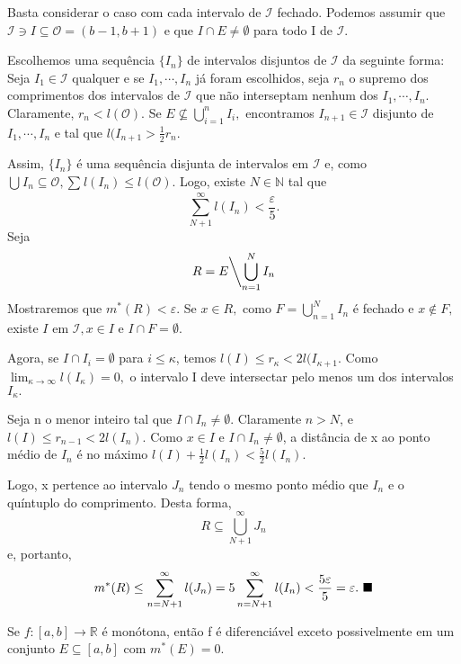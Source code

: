 \documentclass[analysis_notes.tex]{subfiles}
\begin{document}
\begin{proof*}
	Basta considerar o caso com cada intervalo de \(\mathcal{I}\) fechado. Podemos assumir que
	\(\mathcal{I}\ni I \subseteq{\mathcal{O}=(b-1, b+1)}\) e que \(I\cap E \neq\emptyset\) para todo I
	de \(\mathcal{I}\).

	Escolhemos uma sequência \(\{I_{n}\}\) de intervalos disjuntos de \(\mathcal{I}\) da
	seguinte forma: Seja \(I_{1}\in \mathcal{I}\) qualquer e se \(I_{1}, \cdots, I_{n}\) já foram
	escolhidos, seja \(r_{n}\) o supremo dos comprimentos dos intervalos de \(\mathcal{I}\) que não interseptam
	nenhum dos \(I_{1}, \cdots, I_{n}\). Claramente, \(r_{n} <  l(\mathcal{O}).\) Se
	\(E\not\subseteq{\bigcup_{i=1}^{n}{I_{i}}},\) encontramos \(I_{n+1}\in \mathcal{I}\)
	disjunto de \(I_{1}, \cdots, I_{n}\) e tal que \(l(I_{n+1} > \frac{1}{2}r_{n}\).

	Assim, \(\{I_{n}\}\) é uma sequência disjunta de intervalos em \(\mathcal{I}\) e, como
	\(\bigcup_{}^{}{I_{n}\subseteq{\mathcal{O}}}, \sum\limits_{}^{}l(I_{n})\leq l(\mathcal{O}).\) Logo,
	existe \(N\in \mathbb{N}\) tal que
	\[
		\sum\limits_{N+1}^{\infty} l(I_{n}) < \frac{\varepsilon }{5}.
	\]
	Seja
	\[
		R = E\biggl\backslash\bigcup_{n=1}^{N}{I_{n}}\biggr.
	\]
	Mostraremos que \(m^{*}(R) < \varepsilon .\) Se \(x\in R,\) como \(F = \bigcup_{n=1}^{N}{I_{n}}\) é
	fechado e \(x\not\in F,\) existe \(I\) em \(\mathcal{I}, x\in I\) e \(I\cap F=\emptyset.\)

	Agora, se \(I\cap I_{i} = \emptyset\) para \(i\leq \kappa \), temos \(l(I)\leq r_{\kappa } < 2l(I_{\kappa +1}.\)
	Como \(\lim_{\kappa \to \infty}l(I_{\kappa }) = 0,\) o intervalo I deve intersectar
	pelo menos um dos intervalos \(I_{\kappa }.\)

	Seja n o menor inteiro tal que \(I\cap I_{n} \neq\emptyset\). Claramente \(n > N\), e
	\(l(I)\leq r_{n-1} < 2l(I_{n}).\) Como \(x\in I\) e \(I\cap I_{n} \neq\emptyset\), a distância de
	x ao ponto médio de \(I_{n}\) é no máximo \(l(I) + \frac{1}{2}l(I_{n}) < \frac{5}{2} l(I_{n}).\)

	Logo, x pertence ao intervalo \(J_{n}\) tendo o mesmo ponto médio que \(I_{n}\) e
	o quíntuplo do comprimento. Desta forma,
	\[
		R\subseteq{\bigcup_{N+1}^{\infty}{J_{n}}}
	\]
	e, portanto,
	\[
		m^{*}(R)\leq \sum\limits_{n=N+1}^{\infty}l(J_{n}) = 5\sum\limits_{n=N+1}^{\infty}l(I_{n}) < \frac{5\varepsilon }{5} = \varepsilon .\text{ $\blacksquare$}
	\]
\end{proof*}
\begin{lemma*}
	Se \(f:[a, b]\rightarrow \mathbb{R}\) é monótona, então f é diferenciável exceto
	possivelmente em um conjunto \(E\subseteq{[a, b]}\) com \(m^{*}(E) = 0\).
\end{lemma*}
\end{document}
